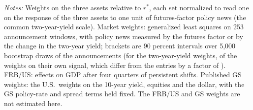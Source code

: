 \begin{table}[tbp]\centering
\caption{Four Sets of Weights on One Scale}\label{tab:fourw}
\begin{flushleft}\footnotesize\textit{Notes:} Weights on the three assets relative to $r^*$, each set normalized to read one on the response of the three assets to one unit of futures-factor policy news (the common two-year-yield scale). Market weights: generalized least squares on 253 announcement windows, with policy news measured by the futures factor or by the change in the two-year yield; brackets are 90 percent intervals over 5,000 bootstrap draws of the announcements (for the two-year-yield weights, of the weights on their own signal, which differ from the entries by a factor of ). FRB/US: effects on GDP after four quarters of persistent shifts. Published GS weights: the U.S.\ weights on the 10-year yield, equities and the dollar, with the GS policy-rate and spread terms held fixed. The FRB/US and GS weights are not estimated here.\end{flushleft}
\end{table}
